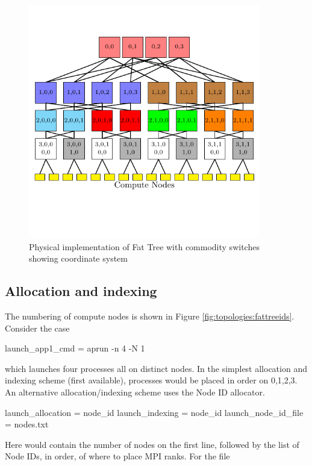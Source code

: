 \begin{figure}[h!]
\centering
\includegraphics[width=0.9\textwidth]{figures/tikz/fattree/fattree_coords.pdf}
\caption{Physical implementation of Fat Tree with commodity switches showing coordinate system}
\label{fig:topologies:fattreecoords}
\end{figure}

\subsection{Allocation and indexing}
The numbering of compute nodes is shown in Figure \ref{fig:topologies:fattreeids}.
Consider the case

\begin{ViFile}
launch_app1_cmd = aprun -n 4 -N 1
\end{ViFile}
which launches four processes all on distinct nodes.
In the simplest allocation and indexing scheme (first available),
processes would be placed in order on 0,1,2,3.
An alternative allocation/indexing scheme uses the Node ID allocator.

\begin{ViFile}
launch_allocation = node_id
launch_indexing = node_id
launch_node_id_file = nodes.txt
\end{ViFile}
Here  would contain the number of nodes on the first line, followed by the list of Node IDs, in order, of where to place MPI ranks.
For the file

